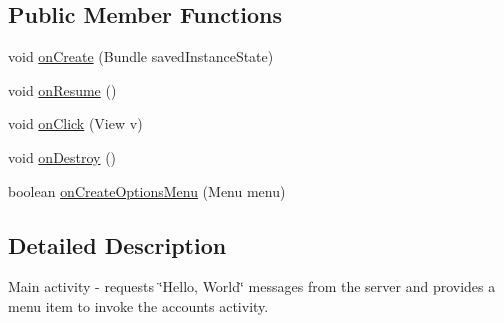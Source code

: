 \subsection*{Public Member Functions}
\begin{DoxyCompactItemize}
\item 
void \hyperlink{classcsc440_1_1nuf_1_1_s_m_i_l_activity_a47e09143aeb07746ff801ee691280413}{on\-Create} (Bundle saved\-Instance\-State)
\item 
void \hyperlink{classcsc440_1_1nuf_1_1_s_m_i_l_activity_a2940cb9bd30e02c726a99b9949f94472}{on\-Resume} ()
\item 
void \hyperlink{classcsc440_1_1nuf_1_1_s_m_i_l_activity_accf1657de6b21643fc49d115e16b6118}{on\-Click} (View v)
\item 
void \hyperlink{classcsc440_1_1nuf_1_1_s_m_i_l_activity_a2f59a58a41923c67061ea32127bf4736}{on\-Destroy} ()
\item 
boolean \hyperlink{classcsc440_1_1nuf_1_1_s_m_i_l_activity_a2745735dd683f9051c5188c8492a8e33}{on\-Create\-Options\-Menu} (Menu menu)
\end{DoxyCompactItemize}


\subsection{Detailed Description}
Main activity -\/ requests \char`\"{}\-Hello, World\char`\"{} messages from the server and provides a menu item to invoke the accounts activity. 

